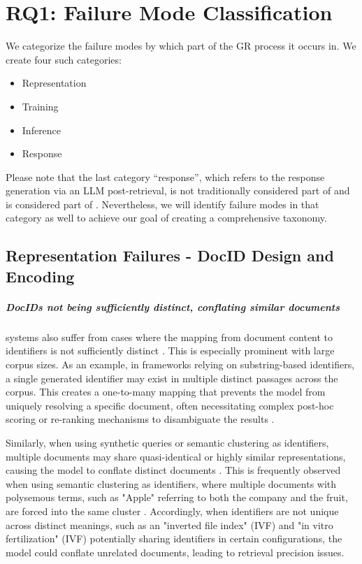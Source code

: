\newpage
\section{RQ1: Failure Mode Classification}
\label{sec:proposed-failure-taxonomy}

We categorize the failure modes by which part of the GR process it occurs in. We create four such categories:
\begin{itemize}
    \item Representation
    \item Training
    \item Inference
    \item Response
\end{itemize}

Please note that the last category ``response'', which refers to the response generation via an LLM post-retrieval, is not traditionally considered part of  and is considered part of . Nevertheless, we will identify failure modes in that category as well to achieve our goal of creating a comprehensive taxonomy.

\subsection{Representation Failures - DocID Design and Encoding}

\subparagraph{DocIDs not being sufficiently distinct, conflating similar documents}
 systems also suffer from cases where the mapping from document content to identifiers is not sufficiently distinct \cite{zhang-multilevel-relevance}. This is especially prominent with large corpus sizes. As an example, in frameworks relying on substring-based identifiers, a single generated identifier may exist in multiple distinct passages across the corpus. This creates a one-to-many mapping that prevents the model from uniquely resolving a specific document, often necessitating complex post-hoc scoring or re-ranking mechanisms to disambiguate the results \cite{michele-bevilacqua-autoregressive-search, yongqi-li-multiview-identifiers}.

Similarly, when using synthetic queries \cite{yubao-tang-semanticenhanced-differentiable}
or semantic clustering \cite{yi-tay-transformer-memory} as identifiers, multiple documents may share quasi-identical or highly similar representations, causing the model to conflate distinct documents \cite{cheng-descriptive-and,weiwei-sun-learning-to,xiaoxi-li-from-matching}. This is frequently observed when using semantic clustering as identifiers, where multiple documents with polysemous terms, such as "Apple" referring to both the company and the fruit, are forced into the same cluster \cite{yi-tay-transformer-memory}. Accordingly, when identifiers are not unique across distinct meanings, such as an "inverted file index" (IVF) and "in vitro fertilization" (IVF) potentially sharing identifiers in certain configurations, the model could conflate unrelated documents, leading to retrieval precision issues.

